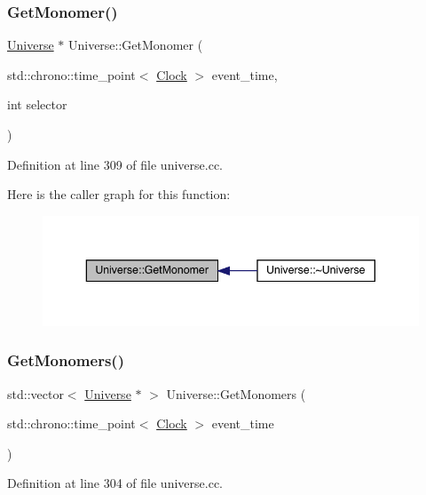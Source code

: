 \subsubsection{\texorpdfstring{Get\+Monomer()}{GetMonomer()}}
{\footnotesize\ttfamily \hyperlink{class_universe}{Universe} $\ast$ Universe\+::\+Get\+Monomer (\begin{DoxyParamCaption}\item[{std\+::chrono\+::time\+\_\+point$<$ \hyperlink{universe_8h_a0ef8d951d1ca5ab3cfaf7ab4c7a6fd80}{Clock} $>$}]{event\+\_\+time,  }\item[{int}]{selector }\end{DoxyParamCaption})}



Definition at line 309 of file universe.\+cc.

Here is the caller graph for this function\+:
\nopagebreak
\begin{figure}[H]
\begin{center}
\leavevmode
\includegraphics[width=343pt]{class_universe_aaa03fb8178d790afd992dd094bb64b47_icgraph}
\end{center}
\end{figure}
\mbox{\label{class_universe_aca82a914e0f8bd7cd1ec80a7220f0a0e}} 
\subsubsection{\texorpdfstring{Get\+Monomers()}{GetMonomers()}}
{\footnotesize\ttfamily std\+::vector$<$ \hyperlink{class_universe}{Universe} $\ast$ $>$ Universe\+::\+Get\+Monomers (\begin{DoxyParamCaption}\item[{std\+::chrono\+::time\+\_\+point$<$ \hyperlink{universe_8h_a0ef8d951d1ca5ab3cfaf7ab4c7a6fd80}{Clock} $>$}]{event\+\_\+time }\end{DoxyParamCaption})}



Definition at line 304 of file universe.\+cc.

